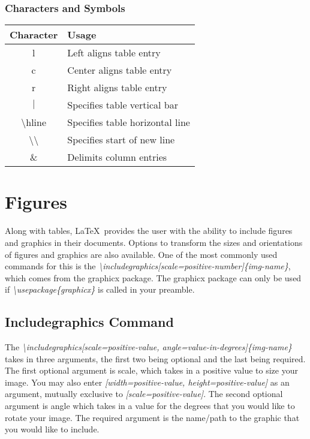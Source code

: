 \documentclass[12pt,journal,compsoc]{IEEEtran}
\begin{document}
\subsubsection*{Characters and Symbols}
\begin{center}
\begin{tabular}{c l}
Character & Usage\\
\hline
l&Left aligns table entry\\
\hline
c&Center aligns table entry\\
\hline
r&Right aligns table entry\\
\hline
$|$&Specifies table vertical bar\\
\hline
\textbackslash hline&Specifies table horizontal line\\
\hline
\textbackslash\textbackslash&Specifies start of new line\\
\hline
\&&Delimits column entries\\
\end{tabular}
\end{center}

\section{Figures}
Along with tables, \LaTeX\ provides the user with the ability to include figures and graphics in their documents. Options to transform the sizes and orientations of figures and graphics are also available. One of the most commonly used commands for this is the \emph{\textbackslash includegraphics[scale=positive-number]\{img-name\}}, which comes from the graphicx package. The graphicx package can only be used if \emph{\textbackslash usepackage\{graphicx\}} is called in your preamble.

\subsection{Includegraphics Command}
The \emph{\textbackslash includegraphics[scale=positive-value, angle=value-in-degrees]\{img-name\}} takes in three arguments, the first two being optional and the last being required. The first optional argument is scale, which takes in a positive value to size your image. You may also enter \emph{[width=positive-value, height=positive-value]} as an argument, mutually exclusive to \emph{[scale=positive-value]}. The second optional argument is angle which takes in a value for the degrees that you would like to rotate your image. The required argument is the name/path to the graphic that you would like to include. 
\end{document}
